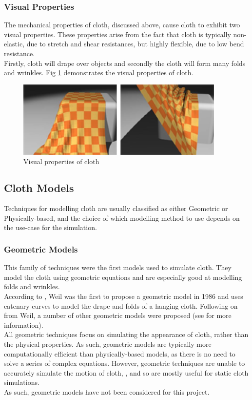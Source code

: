 \subsubsection{Visual Properties}
\label{sec:visual properties}
The mechanical properties of cloth, discussed above, cause cloth to exhibit two visual properties. These properties arise from the fact that cloth is typically non-elastic, due to stretch and shear resistances, but highly flexible, due to low bend resistance.
\\Firstly, cloth will drape over objects and secondly the cloth will form many folds and wrinkles. Fig \ref{fig:visual properties} demonstrates the visual properties of cloth.
\begin{figure}[tp]
   \begin{center}
     \includegraphics{Figures/visual_properties}
   \end{center}
   \caption[Visual Properties of cloth]{Visual properties of cloth \parencite[1]{Yalcn}}
   \label{fig:visual properties}
\end{figure}

\subsection{Cloth Models}
Techniques for modelling cloth are usually classified as either Geometric or Physically-based, and the choice of which modelling method to use depends on the use-case for the simulation.

\subsubsection{Geometric Models}
This family of techniques were the first models used to simulate cloth. They model the cloth using geometric equations and are especially good at modelling folds and wrinkles.
\\According to \textcite{Ng1996}, Weil was the first to propose a geometric model in 1986 and uses catenary curves to model the drape and folds of a hanging cloth. Following on from Weil, a number of other geometric models were proposed (see \textcite{Ng1996} for more information).
\\All geometric techniques focus on simulating the appearance of cloth, rather than the physical properties. As such, geometric models are typically more computationally efficient than physically-based models, as there is no need to solve a series of complex equations. However, geometric techniques are unable to accurately simulate the motion of cloth, \parencites[1]{Mongus2012}[2]{Zhang2001}[1-2]{Xinrong2009}, and so are mostly useful for static cloth simulations.
\\As such, geometric models have not been considered for this project.

